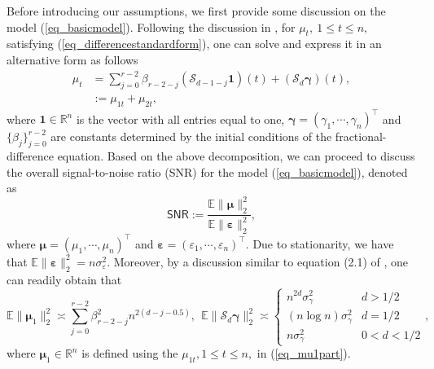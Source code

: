 \documentclass[11pt]{article}
\newcommand{\SNR}{\mathsf{SNR}}
\newcommand{\calS}{\mathcal{S}}
\numberwithin{equation}{section}
\numberwithin{figure}{section}
\begin{document}
Before introducing our assumptions, we first provide some discussion on the model (\ref{eq_basicmodel}). Following the discussion in \cite{burman_shumway2009estimation}, for $\mu_t, \ 1 \leq t \leq n,$ satisfying (\ref{eq_differencestandardform}), one can solve and express it in an alternative form as follows
\begin{align}\label{eq_mu1part}
\mu_t& =\sum_{j=0}^{r-2} \beta_{r-2-j} (\calS_{d-1-j} \bm{1})(t)+(\calS_d \bm{\gamma})(t), \nonumber \\
&:=\mu_{1t}+\mu_{2t}, 
\end{align}
where $\bm{1} \in \mathbb{R}^n$ is the vector with all entries equal to one, $\bm{\gamma}=(\gamma_1, \cdots, \gamma_n)^\top$ and \(\{\beta_j\}_{j=0}^{r-2}\) are constants determined by the initial conditions of the fractional-difference equation. Based on the above decomposition, we can proceed to discuss the overall signal-to-noise ratio (SNR) for the model (\ref{eq_basicmodel}), denoted as 
\begin{equation}\label{eq_defnsnr}
\SNR:=\frac{\mathbb{E} \|\bm{\mu} \|_2^2}{\mathbb{E} \| \bm{\varepsilon} \|_2^2},
\end{equation}     
where $\bm{\mu}=(\mu_1, \cdots, \mu_n)^\top$ and $\bm{\varepsilon}=(\varepsilon_1, \cdots, \varepsilon_n)^\top.$ Due to stationarity, we have that $\mathbb{E}\|\bm{\varepsilon} \|_2^2=n\sigma_\varepsilon^2.$ Moreover, by a discussion similar to equation (2.1) of \cite{burman_shumway2009estimation}, one can readily obtain that 
\begin{equation}\label{eq_basicdefinition}
\mathbb{E}\| \bm{\mu}_1 \|_2^2 \asymp \sum_{j=0}^{r-2} \beta^2_{r-2-j}n^{2(d-j-0.5)}, \ \ \mathbb{E} \| \calS_d \bm{\gamma} \|_2^2 \asymp \left\{
\begin{array}{cc}
n^{2d} \sigma_{\gamma}^{2} & d>1/2 \\ 
 (n\log n) \sigma_{\gamma}^{2} & d=1/2 \\ 
n \sigma_{\gamma}^{2} & 0<d<1/2%
\end{array}
\right. , 
\end{equation} 
where $\bm{\mu}_1 \in \mathbb{R}^n$ is defined using the $\mu_{1t}, 1 \leq t \leq n,$ in (\ref{eq_mu1part}). 
\end{document}
